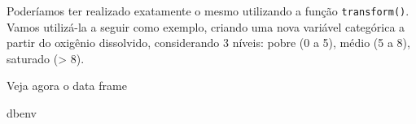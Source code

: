 \documentclass[
]{book}
\newenvironment{Shaded}{\begin{snugshade}}{\end{snugshade}}
\newcommand{\AttributeTok}[1]{\textcolor[rgb]{0.77,0.63,0.00}{#1}}
\newcommand{\DecValTok}[1]{\textcolor[rgb]{0.00,0.00,0.81}{#1}}
\newcommand{\FunctionTok}[1]{\textcolor[rgb]{0.00,0.00,0.00}{#1}}
\newcommand{\NormalTok}[1]{#1}
\newcommand{\OtherTok}[1]{\textcolor[rgb]{0.56,0.35,0.01}{#1}}
\newcommand{\SpecialCharTok}[1]{\textcolor[rgb]{0.00,0.00,0.00}{#1}}
\newcommand{\StringTok}[1]{\textcolor[rgb]{0.31,0.60,0.02}{#1}}
\begin{document}
Poderíamos ter realizado exatamente o mesmo utilizando a função \texttt{transform()}. Vamos utilizá-la a seguir como exemplo, criando uma nova variável categórica a partir do oxigênio dissolvido, considerando 3 níveis: pobre (0 a 5), médio (5 a 8), saturado (\textgreater{} 8).

\begin{Shaded}
\end{Shaded}

Veja agora o data frame

\begin{Shaded}
\begin{Highlighting}[]
\NormalTok{dbenv}
\end{Highlighting}
\end{Shaded}
\end{document}
